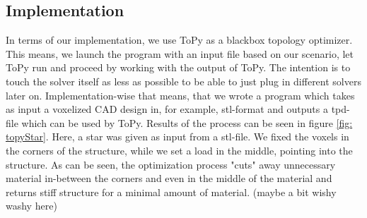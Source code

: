 \subsection{Implementation}
In terms of our implementation, we use ToPy as a blackbox topology optimizer. This means, we launch the program with an input file based on our scenario, let ToPy run and proceed by working with the output of ToPy. The intention is to touch the solver itself as less as possible to be able to just plug in different solvers later on. Implementation-wise that means, that we wrote a program which takes as input a voxelized CAD design in, for example, stl-format and outputs a tpd-file which can be used by ToPy. Results of the process can be seen in figure \ref{fig: topyStar}. Here, a star was given as input from a stl-file. We fixed the voxels in the corners of the structure, while we set a load in the middle, pointing into the structure. As can be seen, the optimization process "cuts" away unnecessary material in-between the corners and even in the middle of the material and returns stiff structure for a minimal amount of material. (maybe a bit wishy washy here)
